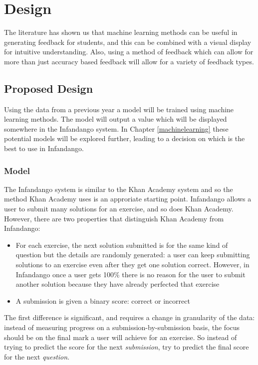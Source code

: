 \chapter{Design}
\label{design}
The literature has shown us that machine learning methods can be useful in generating feedback for students, and this can be combined with a visual display for intuitive understanding. Also, using a method of feedback which can allow for more than just accuracy based feedback will allow for a variety of feedback types.

\section{Proposed Design}
Using the data from a previous year a model will be trained using machine learning methods. The model will output a value which will be displayed somewhere in the Infandango system. In Chapter \ref{machinelearning} these potential models will be explored further, leading to a decision on which is the best to use in Infandango.
\subsection{Model}
The Infandango system is similar to the Khan Academy system and so the method Khan Academy uses is an approriate starting point. Infandango allows a user to submit many solutions for an exercise, and so does Khan Academy. However, there are two properties that distinguish Khan Academy from Infandango:

\begin{itemize}
\item For each exercise, the next solution submitted is for the same kind of question but the details are randomly generated: a user can keep submitting solutions to an exercise even after they get one solution correct. However, in Infandango once a user gets 100\% there is no reason for the user to submit another solution because they have already perfected that exercise
\item A submission is given a binary score: correct or incorrect
\end{itemize}

The first difference is significant, and requires a change in granularity of the data: instead of measuring progress on a submission-by-submission basis, the focus should be on the final mark a user will achieve for an exercise. So instead of trying to predict the score for the next {\it submission}, try to predict the final score for the next {\it question}.

